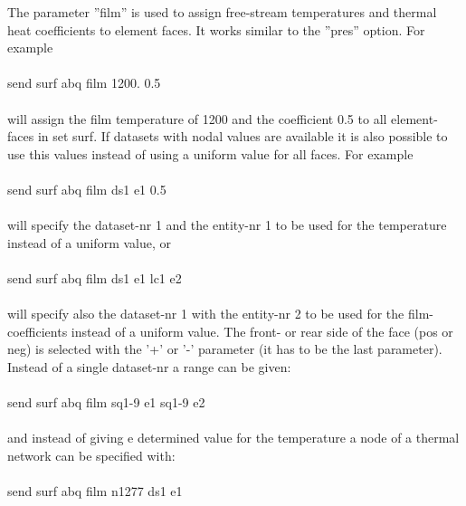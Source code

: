 \documentclass{article}
\begin{document}
The parameter ''film'' is used to assign free-stream temperatures and thermal heat coefficients to element faces. It works similar to the ''pres'' option. For example\\\\send surf abq film 1200. 0.5\\\\will assign the film temperature of 1200 and the coefficient 0.5 to all element-faces in set surf. If datasets with nodal values are available it is also possible to use this values instead of using a uniform value for all faces. For example\\\\send surf abq film ds1 e1 0.5\\\\will specify the dataset-nr 1 and the entity-nr 1 to be used for the temperature instead of a uniform value, or \\\\send surf abq film ds1 e1 lc1 e2\\\\will specify also the dataset-nr 1 with the entity-nr 2 to be used for the film-coefficients instead of a uniform value. The front- or rear side of the face (pos or neg) is selected with the '+' or '-' parameter (it has to be the last parameter). Instead of a single dataset-nr a range can be given:\\\\send surf abq film sq1-9 e1 sq1-9 e2\\\\and instead of giving e determined value for the temperature a node of a thermal network can be specified with: \\\\send surf abq film n1277 ds1 e1\\\\
\end{document}
